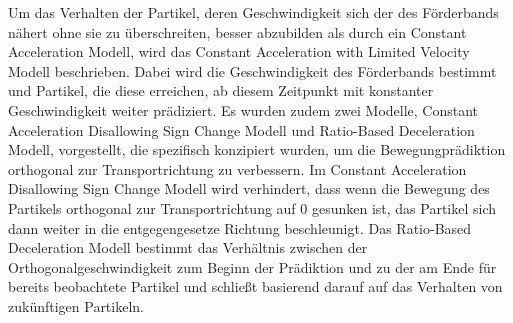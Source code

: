 Um das Verhalten der Partikel, deren Geschwindigkeit sich der des Förderbands nähert ohne sie zu überschreiten, besser abzubilden als durch ein Constant Acceleration Modell,
wird das Constant Acceleration with Limited Velocity Modell beschrieben. 
Dabei wird die Geschwindigkeit des Förderbands bestimmt und Partikel, die diese erreichen, ab diesem Zeitpunkt mit konstanter Geschwindigkeit weiter prädiziert.
Es wurden zudem zwei Modelle, Constant Acceleration Disallowing Sign Change Modell und Ratio-Based Deceleration Modell, vorgestellt, 
die spezifisch konzipiert wurden, um die Bewegungprädiktion orthogonal zur Transportrichtung zu verbessern.
Im Constant Acceleration Disallowing Sign Change Modell wird verhindert, dass wenn die Bewegung des Partikels orthogonal zur Transportrichtung auf 0 gesunken ist, das Partikel sich dann weiter in die entgegengesetze Richtung beschleunigt.
Das Ratio-Based Deceleration Modell bestimmt das Verhältnis zwischen der Orthogonalgeschwindigkeit zum Beginn der Prädiktion und zu der am Ende für bereits beobachtete Partikel
und schließt basierend darauf auf das Verhalten von zukünftigen Partikeln.


